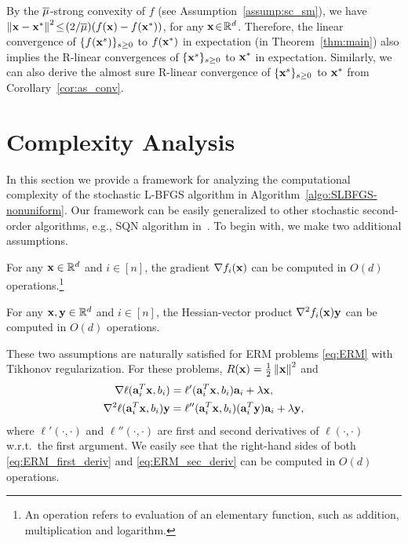 \documentclass[10pt,twocolumn,journal]{IEEEtran}
\begin{document}
\begin{remark}
By the $\overline{\mu}$-strong convexity of $f$ (see Assumption~\ref{assump:sc_sm}), we have $\left\Vert\mathbf{x}-\mathbf{x}^*\right\Vert^2\!\le\! (2/\overline{\mu})(f(\mathbf{x})-f(\mathbf{x}^*))$, for any $\mathbf{x}\!\in\!\mathbb{R}^d$. Therefore, the linear convergence of $\{f(\mathbf{x}^s)\}_{s\ge 0}$ to $f(\mathbf{x}^*)$ in expectation (in Theorem~\ref{thm:main}) also implies the R-linear convergences of $\{\mathbf{x}^s\}_{s\ge 0}$ to $\mathbf{x}^*$ in expectation. 
Similarly, we can also derive the almost sure R-linear convergence of $\{\mathbf{x}^s\}_{s\ge 0}$ to $\mathbf{x}^*$ from Corollary~\ref{cor:as_conv}. 
\end{remark}

\section{Complexity Analysis}\label{sec:comp_analysis}

In this section we provide a framework for analyzing the computational complexity of the stochastic L-BFGS algorithm in Algorithm~\ref{algo:SLBFGS-nonuniform}. %
Our framework can be easily generalized to other stochastic second-order algorithms, e.g., SQN algorithm in~\cite{Byrd_16a}. To begin with, we make two additional assumptions.

\begin{assump}\label{assump:gradient_O(d)}
For any $\mathbf{x}\in\mathbb{R}^d$ and $i\in[n]$, the gradient $\nabla f_i(\mathbf{x})$ can be computed in $O(d)$ operations.\footnote{An operation refers to evaluation of an elementary function, such as addition, multiplication and logarithm.}
\end{assump}

\begin{assump}\label{assump:Hess_vect_O(d)}
For any $\mathbf{x},\mathbf{y}\in\mathbb{R}^d$ and $i\in[n]$, the Hessian-vector product $\nabla^2 f_i(\mathbf{x})\mathbf{y}$ can be computed in $O(d)$ operations.
\end{assump}

\begin{remark}
These two assumptions are naturally satisfied for ERM problems \eqref{eq:ERM} with Tikhonov regularization. For these problems, $R(\mathbf{x}) = \frac{1}{2}\left\Vert\mathbf{x}\right\Vert^2$ and 
\begin{align}
\nabla  \ell(\mathbf{a}_i^T\mathbf{x},b_i)&= \ell'(\mathbf{a}_i^T\mathbf{x},b_i)\mathbf{a}_i + \lambda\mathbf{x},\label{eq:ERM_first_deriv}\\
\nabla^2  \ell(\mathbf{a}_i^T\mathbf{x},b_i)\mathbf{y}&= \ell''(\mathbf{a}_i^T\mathbf{x},b_i)(\mathbf{a}_i^T\mathbf{y})\mathbf{a}_i+\lambda\mathbf{y},\label{eq:ERM_sec_deriv}
\end{align}
where $\ell'(\cdot,\cdot)$ and $\ell''(\cdot,\cdot)$ are first and second derivatives of $\ell(\cdot,\cdot)$ w.r.t.\ the first argument. We easily see 
that the right-hand sides of both \eqref{eq:ERM_first_deriv} and \eqref{eq:ERM_sec_deriv} can be computed in $O(d)$ operations. 
\end{remark}
\end{document}
